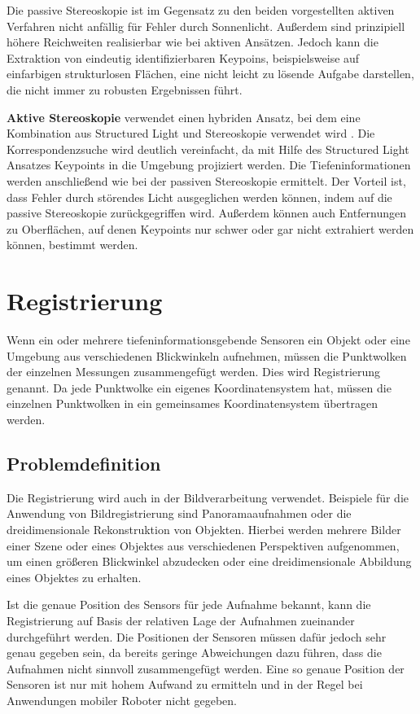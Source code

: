 Die passive Stereoskopie ist im Gegensatz zu den beiden vorgestellten aktiven Verfahren nicht anfällig für Fehler durch Sonnenlicht. Außerdem sind prinzipiell höhere Reichweiten realisierbar wie bei aktiven Ansätzen. Jedoch kann die Extraktion von eindeutig identifizierbaren Keypoins, beispielsweise auf einfarbigen strukturlosen Flächen, eine nicht leicht zu lösende Aufgabe darstellen, die nicht immer zu robusten Ergebnissen führt. 

\textbf{Aktive Stereoskopie} verwendet einen hybriden Ansatz, bei dem eine Kombination aus Structured Light und Stereoskopie verwendet wird \cite{Modrow2008}. Die Korrespondenzsuche wird deutlich vereinfacht, da mit Hilfe des Structured Light Ansatzes Keypoints in die Umgebung projiziert werden. Die Tiefeninformationen werden anschließend wie bei der passiven Stereoskopie ermittelt. Der Vorteil ist, dass Fehler durch  störendes Licht ausgeglichen werden können, indem auf die passive Stereoskopie zurückgegriffen wird. Außerdem können auch Entfernungen zu Oberflächen, auf denen Keypoints nur schwer oder gar nicht extrahiert werden können, bestimmt werden. 


\section[Registrierung (Kopp)]{Registrierung}

Wenn ein oder mehrere tiefeninformationsgebende Sensoren ein Objekt oder eine Umgebung aus verschiedenen Blickwinkeln aufnehmen, müssen die Punktwolken der einzelnen Messungen zusammengefügt werden. Dies wird Registrierung genannt. Da jede Punktwolke ein eigenes Koordinatensystem hat, müssen die einzelnen Punktwolken in ein gemeinsames Koordinatensystem übertragen werden. 

\subsection[Problemdefinition (Kopp)]{Problemdefinition}

Die Registrierung wird auch in der Bildverarbeitung verwendet. Beispiele für die Anwendung von Bildregistrierung sind Panoramaaufnahmen oder die dreidimensionale Rekonstruktion von Objekten. Hierbei werden mehrere Bilder einer Szene oder eines Objektes aus verschiedenen Perspektiven aufgenommen, um einen größeren Blickwinkel abzudecken oder eine dreidimensionale Abbildung eines Objektes zu erhalten. 

Ist die genaue Position des Sensors für jede Aufnahme bekannt, kann die Re\-gis\-trie\-rung auf Basis der relativen Lage der Aufnahmen zueinander durchgeführt werden. Die Positionen der Sensoren müssen dafür jedoch sehr genau gegeben sein, da bereits geringe Abweichungen dazu führen, dass die Aufnahmen nicht sinnvoll zusammengefügt werden. Eine so genaue Position der Sensoren ist nur mit hohem Aufwand zu ermitteln und in der Regel bei Anwendungen mobiler Roboter nicht gegeben. 

